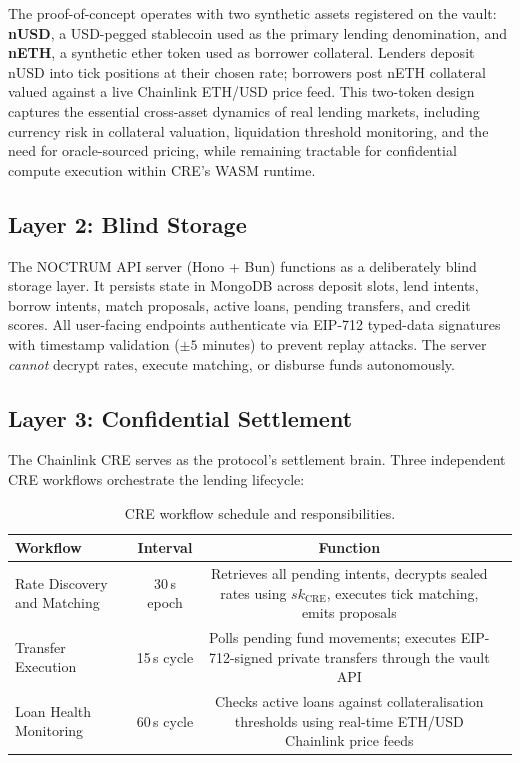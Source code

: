 \documentclass[a4paper,11pt]{article}
\begin{document}
The proof-of-concept operates with two synthetic assets registered on the
vault: \textbf{nUSD}, a USD-pegged stablecoin used as the primary lending
denomination, and \textbf{nETH}, a synthetic ether token used as borrower
collateral. Lenders deposit nUSD into tick positions at their chosen rate;
borrowers post nETH collateral valued against a live Chainlink ETH/USD
price feed. This two-token design captures the essential cross-asset
dynamics of real lending markets, including currency risk in collateral
valuation, liquidation threshold monitoring, and the need for
oracle-sourced pricing, while remaining tractable for confidential compute execution within
CRE's WASM runtime.

\subsection{Layer 2: Blind Storage}

The NOCTRUM API server (Hono + Bun) functions as a deliberately blind storage
layer. It persists state in MongoDB across deposit slots, lend intents,
borrow intents, match proposals, active loans, pending transfers, and credit
scores. All user-facing endpoints authenticate via EIP-712 typed-data
signatures with timestamp validation ($\pm 5$ minutes) to prevent replay
attacks. The server \textit{cannot} decrypt rates, execute matching, or
disburse funds autonomously.

\subsection{Layer 3: Confidential Settlement}

The Chainlink CRE serves as the protocol's settlement brain. Three
independent CRE workflows orchestrate the lending lifecycle:

\begin{table}[H]
\centering
\caption{CRE workflow schedule and responsibilities.}
\renewcommand{\arraystretch}{1.4}
\begin{tabular}{@{}p{}cc p{}@{}}
  \toprule
  \textbf{Workflow} & \textbf{Interval} & \textbf{Function} \\
  \midrule
  Rate Discovery and Matching & 30\,s epoch &
    Retrieves all pending intents, decrypts sealed rates using
    $sk_{\mathrm{CRE}}$, executes tick matching, emits proposals \\
  Transfer Execution & 15\,s cycle &
    Polls pending fund movements; executes EIP-712-signed private
    transfers through the vault API \\
  Loan Health Monitoring & 60\,s cycle &
    Checks active loans against collateralisation thresholds using
    real-time ETH/USD Chainlink price feeds \\
  \bottomrule
\end{tabular}
\label{tab:workflows}
\end{table}
\end{document}
